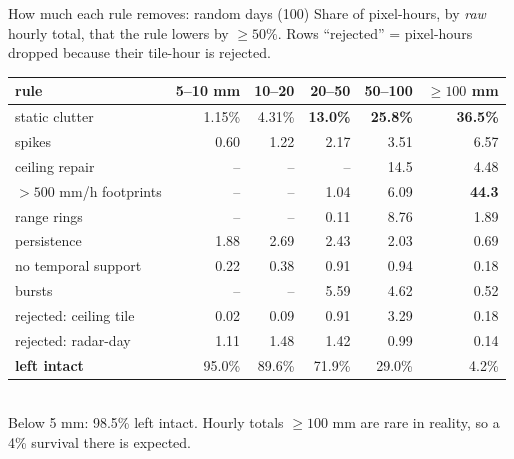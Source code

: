 \documentclass[aspectratio=169,10pt]{beamer}
\begin{document}
\begin{frame}{How much each rule removes: random days (100)}
  \footnotesize
  Share of pixel-hours, by \emph{raw} hourly total, that the rule lowers by $\ge 50\%$.
  Rows ``rejected'' = pixel-hours dropped because their tile-hour is rejected.\\[4pt]
  \begin{tabular}{lrrrrr}
    \toprule
    rule & 5--10 mm & 10--20 & 20--50 & 50--100 & $\ge 100$ mm \\
    \midrule
    static clutter & 1.15\% & 4.31\% & \textbf{13.0\%} & \textbf{25.8\%} & \textbf{36.5\%} \\
    spikes & 0.60 & 1.22 & 2.17 & 3.51 & 6.57 \\
    ceiling repair & -- & -- & -- & 14.5 & 4.48 \\
    $>500$ mm/h footprints & -- & -- & 1.04 & 6.09 & \textbf{44.3} \\
    range rings & -- & -- & 0.11 & 8.76 & 1.89 \\
    persistence & 1.88 & 2.69 & 2.43 & 2.03 & 0.69 \\
    no temporal support & 0.22 & 0.38 & 0.91 & 0.94 & 0.18 \\
    bursts & -- & -- & 5.59 & 4.62 & 0.52 \\
    rejected: ceiling tile & 0.02 & 0.09 & 0.91 & 3.29 & 0.18 \\
    rejected: radar-day & 1.11 & 1.48 & 1.42 & 0.99 & 0.14 \\
    \midrule
    \textbf{left intact} & 95.0\% & 89.6\% & 71.9\% & 29.0\% & 4.2\% \\
    \bottomrule
  \end{tabular}\\[4pt]
  Below 5 mm: 98.5\% left intact. Hourly totals $\ge 100$ mm are rare in reality, so a 4\%
  survival there is expected.
\end{frame}
\end{document}
